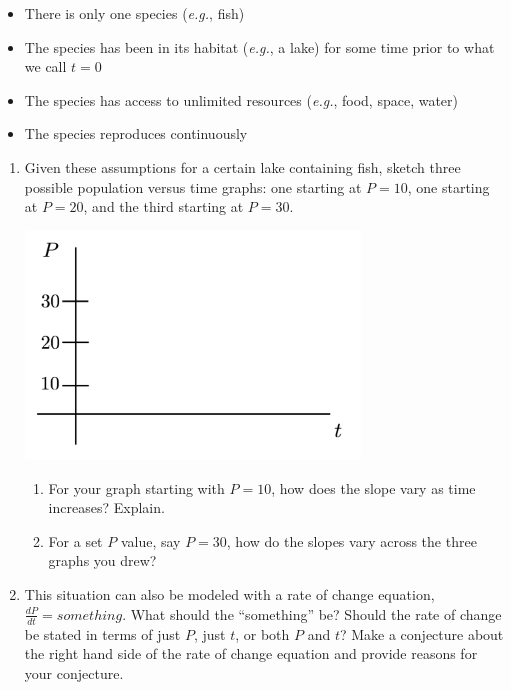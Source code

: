 \begin{itemize}
\item	There is only one species ({\em e.g.}, fish)
\item	The species has been in its habitat ({\em e.g.}, a lake) for some time prior to what we call $t = 0$
\item	The species has access to unlimited resources ({\em e.g.}, food, space, water) 
\item	The species reproduces continuously

\end{itemize}
\begin{enumerate}[resume]
\item	Given these assumptions for a certain lake containing fish, sketch three possible population versus time graphs: one starting at $P = 10$, one starting at $P = 20$, and the third starting at $P = 30$. \label{01problem2}

\begin{center}
\includegraphics[width=3.5in]{01/01FishGraph.png}
\end{center}
\vspace{-.5in}
\begin{enumerate}
\item	For your graph starting with $P = 10$, how does the slope vary as time increases? Explain. \label{01problem2parta}
\vfill
\item	For a set $P$ value, say $P = 30$, how do the slopes vary across the three graphs you drew? \label{01problem2partb}
\vfill
\end{enumerate}
\item	This situation can also be modeled with a rate of change equation, $\frac{dP}{dt}=something$.  What should the ``something'' be? Should the rate of change be stated in terms of just $P$, just $t$, or both $P$ and $t$? Make a conjecture about the right hand side of the rate of change equation and provide reasons for your conjecture. \label{01problem3}
\end{enumerate}
\vfill

